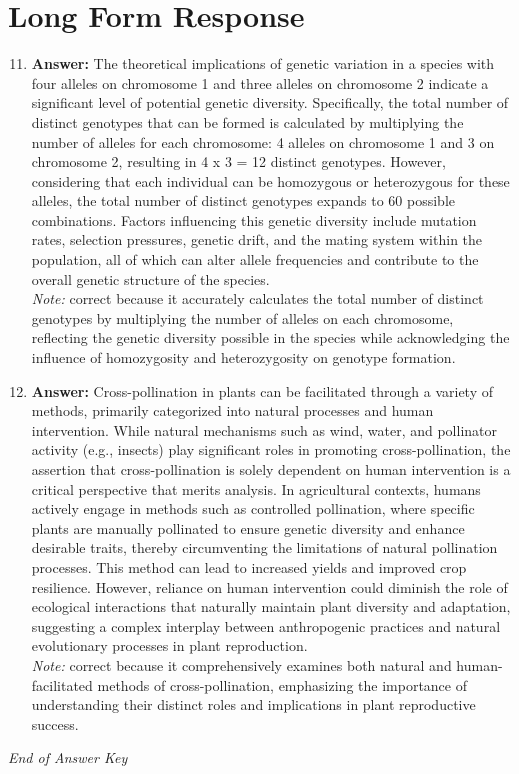 \documentclass[12pt]{article}
\begin{document}
\section*{Long Form Response}
\begin{enumerate}[label=\arabic*.]
\setcounter{enumi}{10}
\item \textbf{Answer:} The theoretical implications of genetic variation in a species with four alleles on chromosome 1 and three alleles on chromosome 2 indicate a significant level of potential genetic diversity. Specifically, the total number of distinct genotypes that can be formed is calculated by multiplying the number of alleles for each chromosome: 4 alleles on chromosome 1 and 3 on chromosome 2, resulting in 4 x 3 = 12 distinct genotypes. However, considering that each individual can be homozygous or heterozygous for these alleles, the total number of distinct genotypes expands to 60 possible combinations. Factors influencing this genetic diversity include mutation rates, selection pressures, genetic drift, and the mating system within the population, all of which can alter allele frequencies and contribute to the overall genetic structure of the species.
\\ \textit{Note:} correct because it accurately calculates the total number of distinct genotypes by multiplying the number of alleles on each chromosome, reflecting the genetic diversity possible in the species while acknowledging the influence of homozygosity and heterozygosity on genotype formation.
\item \textbf{Answer:} Cross-pollination in plants can be facilitated through a variety of methods, primarily categorized into natural processes and human intervention. While natural mechanisms such as wind, water, and pollinator activity (e.g., insects) play significant roles in promoting cross-pollination, the assertion that cross-pollination is solely dependent on human intervention is a critical perspective that merits analysis. In agricultural contexts, humans actively engage in methods such as controlled pollination, where specific plants are manually pollinated to ensure genetic diversity and enhance desirable traits, thereby circumventing the limitations of natural pollination processes. This method can lead to increased yields and improved crop resilience. However, reliance on human intervention could diminish the role of ecological interactions that naturally maintain plant diversity and adaptation, suggesting a complex interplay between anthropogenic practices and natural evolutionary processes in plant reproduction.
\\ \textit{Note:} correct because it comprehensively examines both natural and human-facilitated methods of cross-pollination, emphasizing the importance of understanding their distinct roles and implications in plant reproductive success.
\end{enumerate}

\vfill
\noindent\textit{End of Answer Key}
\end{document}
